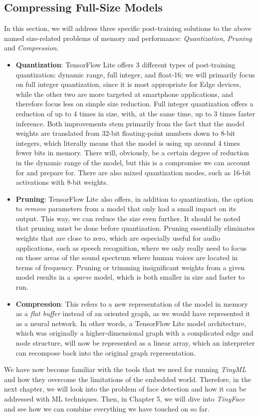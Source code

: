 \subsection{Compressing Full-Size Models}
In this section, we will address three specific post-training solutions to the above named size-related problems of memory and performance: \textit{Quantization}, \textit{Pruning} and \textit{Compression}. \par
\begin{itemize}
    \item \textbf{Quantization}: TensorFlow Lite offers 3 different types of post-training quantization: dynamic range, full integer, and float-16; we will primarily focus on full integer quantization, since it is most appropriate for Edge devices, while the other two are more targeted at smartphone applications, and therefore focus less on simple size reduction. Full integer quantization offers a reduction of up to 4 times in size, with, at the same time, up to 3 times faster inference. Both improvements stem primarily from the fact that the model weights are translated from 32-bit floating-point numbers down to 8-bit integers, which literally means that the model is using up around 4 times fewer bits in memory.  \cite{tflite_quantization} There will, obviously, be a certain degree of reduction in the dynamic range of the model, but this is a compromise we can account for and prepare for. There are also mixed quantization modes, such as 16-bit activations with 8-bit weights.
    \item \textbf{Pruning}: TensorFlow Lite also offers, in addition to quantization, the option to \textit{remove} parameters from a model that only had a small impact on its output. This way, we can reduce the size even further. It should be noted that pruning must be done before quantization. Pruning essentially eliminates weights that are close to zero, which are especially useful for audio applications, such as speech recognition, where we only really need to focus on those areas of the sound spectrum where human voices are located in terms of frequency. Pruning or trimming insignificant weights from a given model results in a \textit{sparse} model, which is both smaller in size and faster to run. \cite{tflite_pruning}
    \item \textbf{Compression}: This refers to a new representation of the model in memory as a \textit{flat buffer} instead of an oriented graph, as we would have represented it as a neural network. In other words, a TensorFlow Lite model architecture, which was originally a higher-dimensional graph with a complicated edge and node structure, will now be represented as a linear array, which an interpreter can recompose back into the original graph representation. \cite{google_prot_buf}
\end{itemize}

We have now become familiar with the tools that we need for running \textit{TinyML} and how they overcome the limitations of the embedded world. Therefore, in the next chapter, we will look into the problem of face detection and how it can be addressed with ML techniques. Then, in Chapter 5, we will dive into \textit{TinyFace} and see how we can combine everything we have touched on so far.
